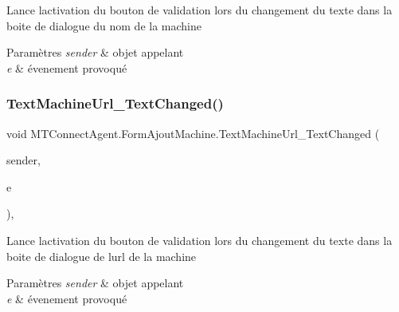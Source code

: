 Lance l\textquotesingle{}activation du bouton de validation lors du changement du texte dans la boite de dialogue du nom de la machine 


\begin{DoxyParams}{Paramètres}
{\em sender} & objet appelant\\
\hline
{\em e} & évenement provoqué\\
\hline
\end{DoxyParams}
\mbox{\label{class_m_t_connect_agent_1_1_form_ajout_machine_acfa9fdb3189331da1245fef3e23f8ed4}} 
\subsubsection{\texorpdfstring{Text\+Machine\+Url\+\_\+\+Text\+Changed()}{TextMachineUrl\_TextChanged()}}
{\footnotesize\ttfamily void M\+T\+Connect\+Agent.\+Form\+Ajout\+Machine.\+Text\+Machine\+Url\+\_\+\+Text\+Changed (\begin{DoxyParamCaption}\item[{object}]{sender,  }\item[{Event\+Args}]{e }\end{DoxyParamCaption})\hspace{0.3cm}{\ttfamily [inline]}, {\ttfamily [private]}}



Lance l\textquotesingle{}activation du bouton de validation lors du changement du texte dans la boite de dialogue de l\textquotesingle{}url de la machine 


\begin{DoxyParams}{Paramètres}
{\em sender} & objet appelant\\
\hline
{\em e} & évenement provoqué\\
\hline
\end{DoxyParams}
\mbox{\label{class_m_t_connect_agent_1_1_form_ajout_machine_a36df449c486dc97b83b4d4463ef98e15}} 

